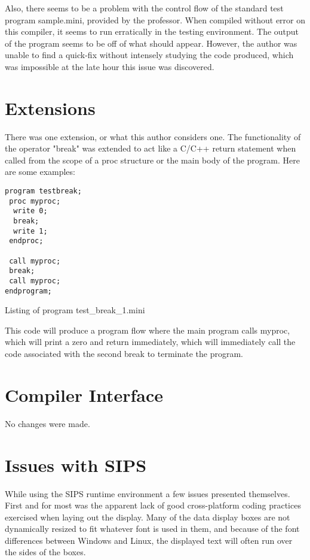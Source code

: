 \documentclass[english]{article}
\begin{document}
Also, there seems to be a problem with the control flow of the standard test
program sample.mini, provided by the professor.  When compiled without error
on this compiler, it seems to run erratically in the testing environment.  The
output of the program seems to be off of what should appear.  However, the author
was unable to find a quick-fix without intensely studying the code produced, which
was impossible at the late hour this issue was discovered.

\section{Extensions}

There was one extension, or what this author considers one.  The functionality of
the operator "break" was extended to act like a C/C++ return statement when called
from the scope of a proc structure or the main body of the program.  Here are some examples:
\begin{program}
	\begin{verbatim}
program testbreak;
 proc myproc;
  write 0;
  break;
  write 1;
 endproc;

 call myproc;
 break;
 call myproc;
endprogram;
	\end{verbatim}
	\caption{Listing of program test\_break\_1.mini}
\end{program}
This code will produce a program flow where the main program calls myproc, which
will print a zero and return immediately, which will immediately call the code
associated with the second break to terminate the program.

\section{Compiler Interface}

No changes were made.

\section{Issues with SIPS}
While using the SIPS runtime environment a few issues presented themselves.  First
and for most was the apparent lack of good cross-platform coding practices exercised
when laying out the display.  Many of the data display boxes are not dynamically
resized to fit whatever font is used in them, and because of the font differences
between Windows and Linux, the displayed text will often run over the sides of the
boxes.
\end{document}
